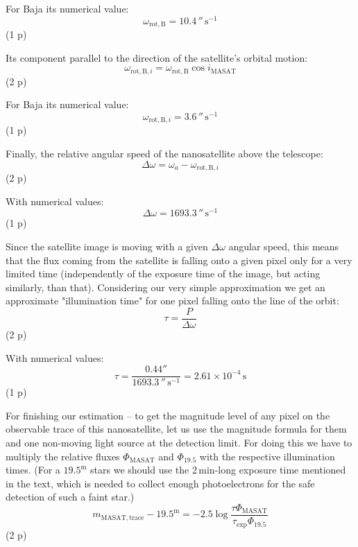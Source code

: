 \begin{description}
For Baja its numerical value:
\[ \omega_{\mathrm{rot,B}} = 10.4\,''\,\mathrm{s^{-1}} \]
\hfill(1 p)

Its component parallel to the direction of the satellite's orbital motion:
\begin{equation*}
\omega_{\mathrm{rot,B},i} = \omega_{\mathrm{rot,B}}\cos i_{\mathrm{MASAT}}
\tag{14.11}
\end{equation*}
\hfill(2 p)

For Baja its numerical value:
\[ \omega_{\mathrm{rot,B},i} = 3.6\,''\,\mathrm{s^{-1}} \]
\hfill(1 p)

Finally, the relative angular speed of the nanosatellite above the telescope:
\begin{equation*}
\Delta\omega = \omega_a - \omega_{\mathrm{rot,B},i} \tag{14.12}
\end{equation*}
\hfill(2 p)

With numerical values:
\[ \Delta\omega = 1693.3\,''\,\mathrm{s^{-1}} \]
\hfill(1 p)


Since the satellite image is moving with a given $\Delta\omega$ angular
speed, this means that the flux coming from the satellite is falling onto a
given pixel only for a very limited time (independently of the exposure time
of the image, but acting similarly, than that). Considering our very simple
approximation we get an approximate "illumination time" for one pixel falling
onto the line of the orbit:
\begin{equation*}
\tau = \frac{P}{\Delta\omega} \tag{14.13}
\end{equation*}
\hfill(2 p)

With numerical values:
\[ \tau = \frac{0.44''}{1693.3\,''\,\mathrm{s^{-1}}}
        = 2.61 \times 10^{-4}\,\mathrm{s} \]
\hfill(1 p)

For finishing our estimation -- to get the magnitude level of any pixel on
the observable trace of this nanosatellite, let us use the magnitude formula
for them and one non-moving light source at the detection limit. For doing
this we have to multiply the relative fluxes $\Phi_{\mathrm{MASAT}}$ and
$\Phi_{19.5}$ with the respective illumination times. (For a
$19.5^{\mathrm{m}}$ stars we should use the 2\,min-long exposure time
mentioned in the text, which is needed to collect enough photoelectrons for
the safe detection of such a faint star.)
\begin{equation*}
m_{\mathrm{MASAT,trace}} - 19.5^{\mathrm{m}}
  = -2.5\log\frac{\tau\Phi_{\mathrm{MASAT}}}
    {\tau_{\mathrm{exp}}\Phi_{19.5}} \tag{14.14}
\end{equation*}
\hfill(2 p)


\end{description}
